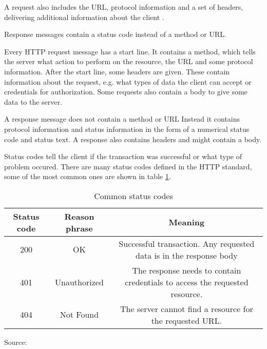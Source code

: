 A request also includes the URL, protocol information and a set of headers, delivering
additional information about the client \cite[47]{gourley2002http}.

Response messages contain a status code instead of a method or URL.


Every HTTP request message has a start line.
It contains a method, which tells the server what action to perform on the resource, the URL
and some protocol information.\cite[47]{gourley2002http}
After the start line, some headers are given. These contain information about the request,
e.g. what types of data the client can accept or credentials for authorization.
Some requests also contain a body to give some data to the server. \cite[52]{gourley2002http}

A response message does not contain a method or URL
Instead it contains protocol information and status information in the form of a numerical
status code and status text.\cite[48]{gourley2002http}
A response also contains headers and might contain a body.\cite[52]{gourley2002http}

Status codes tell the client if the transaction was successful or what type of problem occured\cite[49]{gourley2002http}.
There are many status codes defined in the HTTP standard,
some of the most common ones are shown in table \ref{tbl:Common status codes}.

\begin{table}[H]
 \caption{Common status codes}
 \label{tbl:Common status codes}
\begin{tabular}{|| c | c | c ||} 
 \hline
 Status code & Reason phrase & Meaning \\ [0.5ex]
 \hline\hline
 200 & OK & Successful transaction. Any requested data is in the response body \\ [1ex]
 \hline
 401 & Unauthorized & The response needs to contain credentials to access the requested resource. \\ [1ex]
 \hline
 404 & Not Found & The server cannot find a resource for the requested URL. \\ [1ex]
 \hline
\end{tabular}
Source: \cite[50]{gourley2002http}
\end{table}




